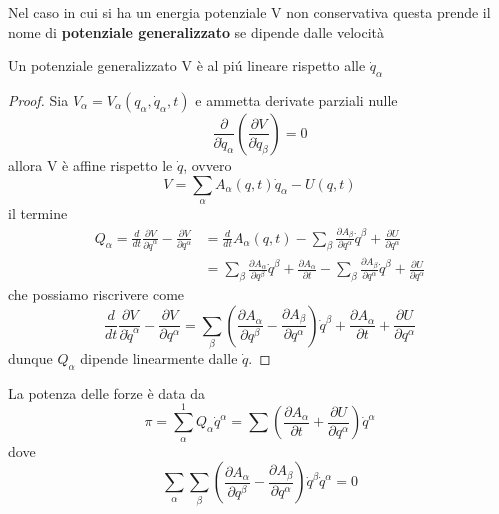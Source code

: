 \noindent Nel caso in cui si ha un energia potenziale V non conservativa questa prende il nome di \textbf{potenziale generalizzato} se dipende dalle velocit\`{a}

\begin{lemma}
Un potenziale generalizzato V \`{e} al pi\'{u} lineare rispetto alle $\dot{q}_{\alpha}$	
\end{lemma}
\begin{proof}
	Sia $V_{\alpha} = V_{\alpha}(q_{\alpha},\dot{q}_{\alpha},t)$ e ammetta derivate parziali nulle 
\begin{equation*}
\frac{\partial}{\partial \dot{q}_{\alpha}}\left(\frac{\partial V}{\partial \dot{q}_{\beta}}\right)=0
\end{equation*}
allora V \`{e} affine rispetto le $\dot{q}$, ovvero
\begin{equation*}
V=\sum_\alpha A_\alpha(q, t) \dot{q}_{\alpha}-U(q, t)
\end{equation*}
il termine 
\begin{equation*}
\begin{aligned}
Q_\alpha =\frac{d}{d t} \frac{\partial V}{\partial \dot{q}^\alpha}-\frac{\partial V}{\partial q^\alpha} & =\frac{d}{d t} A_\alpha(q, t)-\sum_\beta \frac{\partial A_\beta}{\partial q^\alpha} \dot{q}^\beta+\frac{\partial U}{\partial q^\alpha} \\
& =\sum_\beta \frac{\partial A_{\alpha}}{\partial q^\beta} \dot{q}^\beta+\frac{\partial A_{\alpha}}{\partial t}-\sum_\beta \frac{\partial A_\beta}{\partial q^\alpha} \dot{q}^\beta+\frac{\partial U}{\partial q^\alpha}
\end{aligned}
\end{equation*}
che possiamo riscrivere come 
\begin{equation}
\frac{d}{d t} \frac{\partial V}{\partial \dot{q}^\alpha}-\frac{\partial V}{\partial q^\alpha}=\sum_\beta\left(\frac{\partial A_{\alpha}}{\partial q^\beta}-\frac{\partial A_{\beta}}{\partial q^\alpha}\right) \dot{q}^\beta+\frac{\partial A_{\alpha}}{\partial t} +\frac{\partial U}{\partial q^\alpha}
\end{equation}
dunque $Q_{\alpha}$ dipende linearmente dalle $\dot{q}$.
\end{proof}
\begin{lemma}
	La potenza delle forze \`{e} data da 
	\begin{equation}
\pi=\sum_\alpha^1 Q_\alpha \dot{q}^\alpha=\sum\left(\frac{\partial A_{\alpha}}{\partial t}+\frac{\partial U}{\partial q^\alpha}\right) \dot{q}^\alpha
\end{equation}
dove 
\begin{equation}
\sum_\alpha \sum_\beta\left(\frac{\partial A_{\alpha}}{\partial q^\beta}-\frac{\partial A_{\beta}}{\partial q^\alpha}\right) \dot{q}^\beta \dot{q}^\alpha=0
\end{equation}
\end{lemma}
